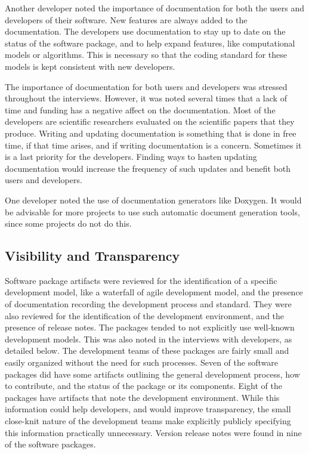 \documentclass[12pt, notitlepage]{article}
\begin{document}
Another developer noted the importance of documentation for both the users and developers of their software. New features are always added to the documentation. The developers use documentation to stay up to date on the status of the software package, and to help expand features, like computational models or algorithms. This is necessary so that the coding standard for these models is kept consistent with new developers.

The importance of documentation for both users and developers was stressed throughout the interviews. However, it was noted several times that a lack of time and funding has a negative affect on the documentation. Most of the developers are scientific researchers evaluated on the scientific papers that they produce. Writing and updating documentation is something that is done in free time, if that time arises, and if writing documentation is a concern. Sometimes it is a last priority for the developers. Finding ways to hasten updating documentation would increase the frequency of such updates and benefit both users and developers. 

One developer noted the use of documentation generators like Doxygen. It would be advisable for more projects to use such automatic document generation tools, since some projects do not do this.  

\subsection{Visibility and Transparency}

Software package artifacts were reviewed for the identification of a specific development model, like a waterfall of agile development model, and the presence of documentation recording the development process and standard. They were also reviewed for the identification of the development environment, and the presence of release notes. The packages tended to not explicitly use well-known development models. This was also noted in the interviews with developers, as detailed below. The development teams of these packages are fairly small and easily organized without the need for such processes. Seven of the software packages did have some artifacts outlining the general development process, how to contribute, and the status of the package or its components. Eight of the packages have artifacts that note the development environment. While this information could help developers, and would improve transparency, the small close-knit nature of the development teams make explicitly publicly specifying this information practically unnecessary. Version release notes were found in nine of the software packages.
\end{document}
